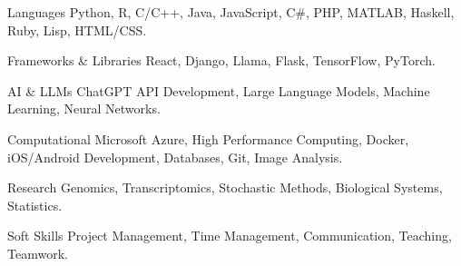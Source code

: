 
\begin{cvskills}

  \cvskill
    {Languages}
    {Python, R, C/C++, Java, JavaScript, C\#, PHP, MATLAB, Haskell, Ruby, Lisp, HTML/CSS.}

  \cvskill
    {Frameworks \& Libraries}
    {React, Django, Llama, Flask, TensorFlow, PyTorch.}

  \cvskill
    {AI \& LLMs}
    {ChatGPT API Development, Large Language Models, Machine Learning, Neural Networks.}

  \cvskill
    {Computational}
    {Microsoft Azure, High Performance Computing, Docker, iOS/Android Development, Databases, Git, Image Analysis.}

  \cvskill
    {Research}
    {Genomics, Transcriptomics, Stochastic Methods, Biological Systems, Statistics.}

  \cvskill
    {Soft Skills}
    {Project Management, Time Management, Communication, Teaching, Teamwork.}

\end{cvskills}
